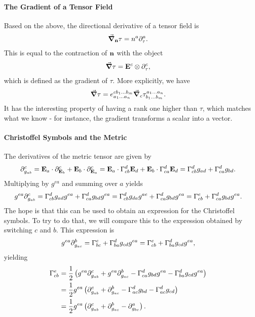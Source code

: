 \paragraph{The Gradient of a Tensor Field}
Based on the above, the directional derivative of a tensor field is
\begin{align*}
	\grad_{\vb{n}}{\tau} = n^{a}\partial^{a}_{\tau}.
\end{align*}
This is equal to the contraction of $\vb{n}$ with the object
\begin{align*}
	\grad{\tau} = \vb{E}^{c}\otimes\partial^{c}_{\tau},
\end{align*}
which is defined as the gradient of $\tau$. More explicitly, we have
\begin{align*}
	\grad{\tau} = \tensor*{e}{^{cb_{1}\dots b_{m}}_{a_{1}\dots a_{n}}}\dcov{c}{\tensor*{\tau}{^{a_{1}\dots a_{n}}_{b_{1}\dots b_{m}}}}.
\end{align*}
It has the interesting property of having a rank one higher than $\tau$, which matches what we know - for instance, the gradient transforms a scalar into a vector.

\paragraph{Christoffel Symbols and the Metric}
The derivatives of the metric tensor are given by
\begin{align*}
	\del{c}{g_{ab}} = \tb{a}\cdot\del{c}{\tb{b}} + \tb{b}\cdot\del{c}{\tb{a}} = \tb{a}\cdot\chris{d}{c}{b}\tb{d} + \tb{b}\cdot\chris{d}{c}{a}\tb{d} = \chris{d}{c}{b}g_{ad} + \chris{d}{c}{a}g_{bd}.
\end{align*}
Multiplying by $g^{ea}$ and summing over $a$ yields
\begin{align*}
	g^{ea}\del{c}{g_{ab}} = \chris{d}{c}{b}g_{ad}g^{ea} + \chris{d}{c}{a}g_{bd}g^{ea} = \chris{d}{c}{b}g_{da}g^{ae} + \chris{d}{c}{a}g_{bd}g^{ea} = \chris{e}{c}{b} + \chris{d}{c}{a}g_{bd}g^{ea}.
\end{align*}
The hope is that this can be used to obtain an expression for the Christoffel symbols. To try to do that, we will compare this to the expression obtained by switching $c$ and $b$. This expression is
\begin{align*}
	g^{ea}\del{b}{g_{ac}} = \chris{e}{b}{c} + \chris{d}{b}{a}g_{cd}g^{ea} = \chris{e}{c}{b} + \chris{d}{b}{a}g_{cd}g^{ea},
\end{align*}
yielding
\begin{align*}
	\chris{e}{c}{b} &= \frac{1}{2}\left(g^{ea}\del{c}{g_{ab}} + g^{ea}\del{b}{g_{ac}} - \chris{d}{c}{a}g_{bd}g^{ea} - \chris{d}{b}{a}g_{cd}g^{ea}\right) \\
	                &= \frac{1}{2}g^{ea}\left(\del{c}{g_{ab}} + \del{b}{g_{ac}} - \chris{d}{a}{c}g_{bd} - \chris{d}{a}{c}g_{cd}\right) \\
	                &= \frac{1}{2}g^{ea}\left(\del{c}{g_{ab}} + \del{b}{g_{ac}} - \del{a}{g_{bc}}\right).
\end{align*}

